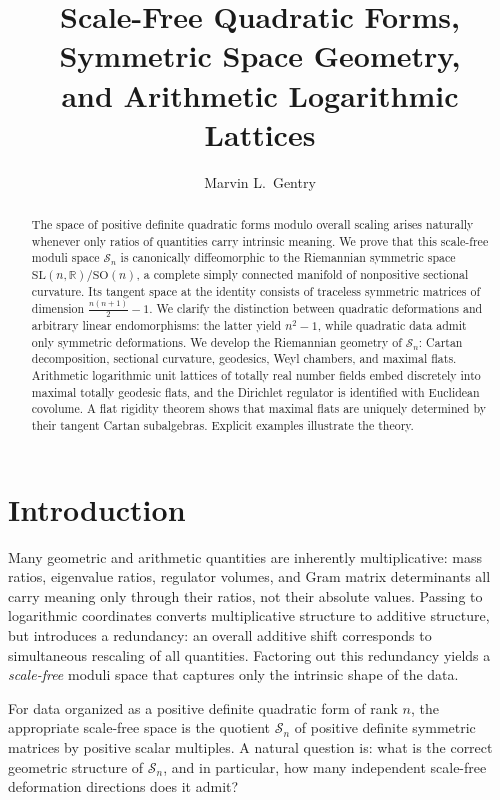 \documentclass[12pt]{article}
\title{Scale-Free Quadratic Forms, Symmetric Space Geometry,\\
and Arithmetic Logarithmic Lattices}
\author[1]{Marvin L.\ Gentry}
\affil[1]{Independent Researcher\\
  \texttt{drmlgentry@protonmail.com}\\
  ORCID: \href{https://orcid.org/0009-0006-4550-2663}{0009-0006-4550-2663}}
\date{}
\theoremstyle{definition}
\theoremstyle{remark}
\newcommand{\R}{\mathbb{R}}
\newcommand{\SL}{\mathrm{SL}}
\newcommand{\SO}{\mathrm{SO}}
\newcommand{\calM}{\mathcal{S}}
\begin{document}
\maketitle

\begin{abstract}
The space of positive definite quadratic forms modulo overall scaling
arises naturally whenever only ratios of quantities carry intrinsic
meaning.
We prove that this scale-free moduli space $\calM_n$ is canonically
diffeomorphic to the Riemannian symmetric space $\SL(n,\R)/\SO(n)$,
a complete simply connected manifold of nonpositive sectional curvature.
Its tangent space at the identity consists of traceless symmetric
matrices of dimension $\frac{n(n+1)}{2}-1$.
We clarify the distinction between quadratic deformations
and arbitrary linear endomorphisms:
the latter yield $n^2-1$, while quadratic data admit only symmetric
deformations.
We develop the Riemannian geometry of $\calM_n$:
Cartan decomposition, sectional curvature,
geodesics, Weyl chambers, and maximal flats.
Arithmetic logarithmic unit lattices of totally real
number fields embed discretely into maximal totally geodesic flats,
and the Dirichlet regulator is identified with Euclidean covolume.
A flat rigidity theorem shows that maximal flats are uniquely
determined by their tangent Cartan subalgebras.
Explicit examples illustrate the theory.
\end{abstract}

\section{Introduction}
\label{sec:intro}

Many geometric and arithmetic quantities are inherently multiplicative:
mass ratios, eigenvalue ratios, regulator volumes, and Gram matrix
determinants all carry meaning only through their ratios, not their
absolute values.
Passing to logarithmic coordinates converts multiplicative structure
to additive structure, but introduces a redundancy: an overall additive
shift corresponds to simultaneous rescaling of all quantities.
Factoring out this redundancy yields a \emph{scale-free} moduli space
that captures only the intrinsic shape of the data.

For data organized as a positive definite quadratic form of rank $n$,
the appropriate scale-free space is the quotient $\calM_n$ of positive
definite symmetric matrices by positive scalar multiples.
A natural question is: what is the correct geometric structure of
$\calM_n$, and in particular, how many independent scale-free
deformation directions does it admit?
\end{document}
